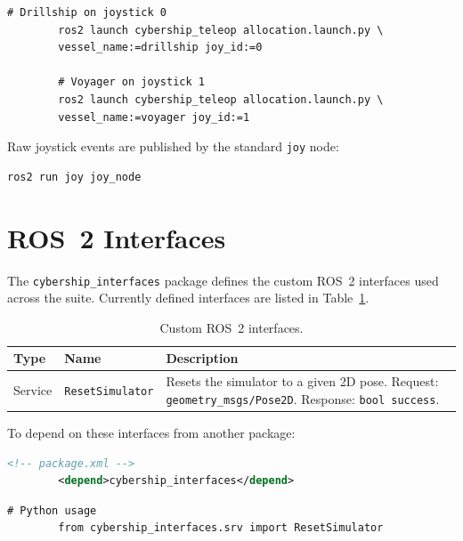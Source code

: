 \documentclass[12pt,a4paper]{article}
\begin{document}
	\begin{lstlisting}[style=bash]
		# Drillship on joystick 0
		ros2 launch cybership_teleop allocation.launch.py \
		vessel_name:=drillship joy_id:=0
		
		# Voyager on joystick 1
		ros2 launch cybership_teleop allocation.launch.py \
		vessel_name:=voyager joy_id:=1
	\end{lstlisting}
	
	Raw joystick events are published by the standard \texttt{joy} node:
	
	\begin{lstlisting}[style=bash]
		ros2 run joy joy_node
	\end{lstlisting}
	
	\section{ROS~2 Interfaces}
	\label{sec:interfaces}
	
	The \texttt{cybership\_interfaces} package defines the custom ROS~2 interfaces used across the
	suite. Currently defined interfaces are listed in Table~\ref{tab:interfaces}.
	
	\begin{table}[ht]
		\centering
		\begin{tabular}{llp{7cm}}
			\toprule
			\textbf{Type} & \textbf{Name}           & \textbf{Description}                     \\
			\midrule
			Service       & \texttt{ResetSimulator} & Resets the simulator to a given 2D pose.
			Request: \texttt{geometry\_msgs/Pose2D}.
			Response: \texttt{bool success}.                                                   \\
			\bottomrule
		\end{tabular}
		\caption{Custom ROS~2 interfaces.}
		\label{tab:interfaces}
	\end{table}
	
	To depend on these interfaces from another package:
	
	\begin{lstlisting}[style=bash,language=XML]
		<!-- package.xml -->
		<depend>cybership_interfaces</depend>
	\end{lstlisting}
	
	\begin{lstlisting}[style=bash]
		# Python usage
		from cybership_interfaces.srv import ResetSimulator
	\end{lstlisting}
	
\end{document}
